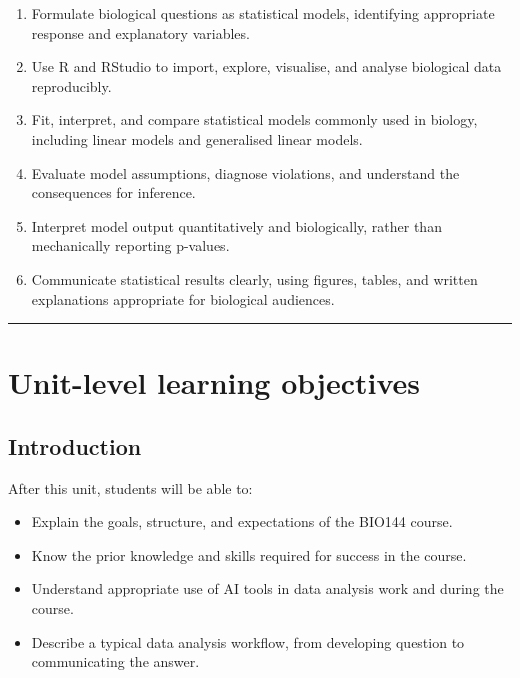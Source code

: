 \documentclass[
  letterpaper,
  8pt,
  a4paper]{book}
\providecommand{\tightlist}{%
  \setlength{\itemsep}{0pt}\setlength{\parskip}{0pt}}
\begin{document}
\begin{enumerate}
\def\labelenumi{\arabic{enumi}.}
\tightlist
\item
  Formulate biological questions as statistical models, identifying
  appropriate response and explanatory variables.
\item
  Use R and RStudio to import, explore, visualise, and analyse
  biological data reproducibly.
\item
  Fit, interpret, and compare statistical models commonly used in
  biology, including linear models and generalised linear models.
\item
  Evaluate model assumptions, diagnose violations, and understand the
  consequences for inference.
\item
  Interpret model output quantitatively and biologically, rather than
  mechanically reporting p-values.
\item
  Communicate statistical results clearly, using figures, tables, and
  written explanations appropriate for biological audiences.
\end{enumerate}

\begin{center}\rule{0.5\linewidth}{0.5pt}\end{center}

\section*{Unit-level learning
objectives}\label{unit-level-learning-objectives}


\subsection*{Introduction}\label{introduction}

After this unit, students will be able to:

\begin{itemize}
\tightlist
\item
  Explain the goals, structure, and expectations of the BIO144 course.
\item
  Know the prior knowledge and skills required for success in the
  course.
\item
  Understand appropriate use of AI tools in data analysis work and
  during the course.
\item
  Describe a typical data analysis workflow, from developing question to
  communicating the answer.
\end{itemize}
\end{document}
